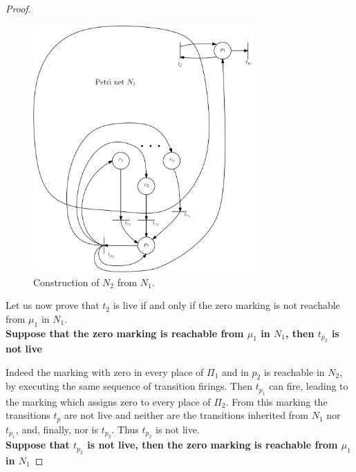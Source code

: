 \begin{proof}
 \begin{center}
	\begin{figure}
\includegraphics[width=0.75\textwidth]{FigurePN}
\caption{Construction of $N_2$ from $N_1$.}
	\end{figure}
\end{center}


Let us now prove that $t_2$ is live if and only if 
the zero marking
is not reachable from $\mu_1$ in $N_1$. \\


{\bf Suppose that the zero marking is reachable from $\mu_1$ in $N_1$, then $t_{p_2}$ is not live}

Indeed the marking with zero in every place of $\Pi_1$ and in $p_2$ is reachable in $N_2$, by executing the same sequence of transition firings. Then $t_{p_1}$ can fire, leading to the marking which assigns zero to every place of $\Pi_2$. From this marking the transitions $t_p$ are not live and neither are the transitions inherited from $N_1$ nor $t_{p_1}$, and, finally, nor is $t_{p_2}$. Thus $t_{p_2}$ is not live. \\


{\bf Suppose that $t_{p_2}$ is not live, then the zero marking is reachable from $\mu_1$ in $N_1$}


\end{proof}
